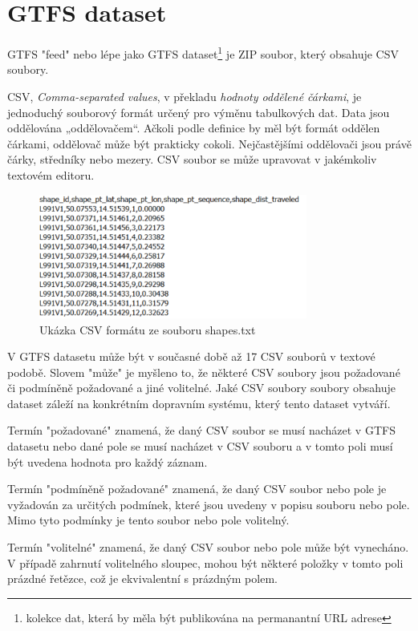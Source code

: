
\section{GTFS dataset}
GTFS "feed" nebo lépe jako GTFS dataset\footnote{kolekce dat, která by měla být publikována na permanantní URL adrese}
je ZIP soubor, který obsahuje CSV soubory.

CSV, \textit{Comma-separated values}, v překladu \textit{hodnoty oddělené čárkami}, je jednoduchý 
souborový formát určený pro výměnu tabulkových dat. Data jsou oddělována „oddělovačem“.
Ačkoli podle definice by měl být formát oddělen čárkami, oddělovač může být prakticky cokoli. 
Nejčastějšími oddělovači jsou právě čárky, středníky nebo mezery. CSV soubor se 
může upravovat v jakémkoliv textovém editoru.

\begin{figure}[H] \centering
    \includegraphics[width=250pt]{./pictures/ukazka-csv.PNG}
    \caption[Ukázka CSV formátu ze souboru shapes.txt]{Ukázka CSV formátu ze souboru shapes.txt}
	\label{fig:ukazka-csv}              
\end{figure}

V GTFS datasetu může být v současné době až 17 CSV souborů v textové podobě. Slovem "může" je myšleno to,
že některé CSV soubory jsou požadované či podmíněně požadované a jiné volitelné.
Jaké CSV soubory soubory obsahuje dataset záleží na konkrétním dopravním systému, který
tento dataset vytváří.

Termín "požadované" znamená, že daný CSV soubor se musí nacházet v GTFS datasetu nebo dané pole
se musí nacházet v CSV souboru a v tomto poli musí být uvedena hodnota pro každý záznam. 

Termín "podmíněně požadované" znamená, že daný CSV soubor nebo pole je vyžadován za určitých podmínek, 
které jsou uvedeny v popisu souboru nebo pole. Mimo tyto podmínky je tento soubor nebo pole volitelný.

Termín "volitelné" znamená, že daný CSV soubor nebo pole může být vynecháno. V případě zahrnutí 
volitelného sloupec, mohou být některé položky v tomto poli prázdné řetězce, což je ekvivalentní s prázdným
polem.

